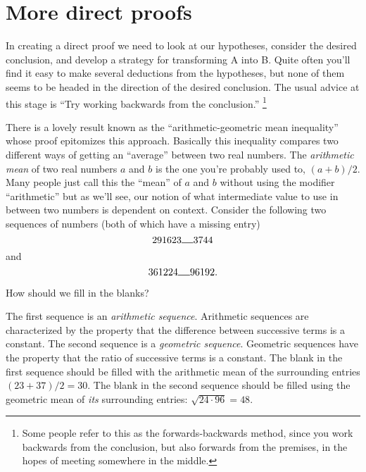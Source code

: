 \documentclass[10pt,]{book}
\theoremstyle{plain}
\theoremstyle{definition}
\theoremstyle{definition}
\numberwithin{equation}{section}
\begin{document}
\section[{More direct proofs}]{More direct proofs}\label{sec_more}

    In creating a direct proof we need to look at our hypotheses, consider
    the desired conclusion, and develop a strategy for transforming A into B.
    Quite often you'll find it easy to make several deductions from the
    hypotheses, but none of them seems to be headed in the direction of
    the desired conclusion. The usual advice at this stage is
    ``Try working backwards from the conclusion.''
    \footnote{Some people refer to this as the forwards-backwards method, since 
    you work backwards from the conclusion, but also forwards from the premises, 
    in the hopes of meeting somewhere in the middle.\label{fn-20}}
\par

    There is a lovely result known as the
    ``arithmetic-geometric mean inequality''
    whose proof epitomizes this approach. Basically this inequality compares two
    different ways of getting an ``average'' between two real numbers. The
    \emph{arithmetic mean} of two real numbers \(a\) and \(b\) is the one you're
    probably used to, \((a+b)/2\). Many people just call this the ``mean''
    of \(a\) and \(b\) without using the modifier ``arithmetic'' but as we'll
    see, our notion of what intermediate value to use in between two numbers
    is dependent on context. Consider the following two sequences of numbers
    (both of which have a missing entry)
    \begin{equation*}
      2  9   16   23   \rule{12pt}{.5pt}   37   44
    \end{equation*}
    and
    \begin{equation*}
      3  6   12   24   \rule{12pt}{.5pt}   96   192.
    \end{equation*}
\par

    How should we fill in the blanks?
\par

    The first sequence is an
    \emph{arithmetic sequence}.
    Arithmetic sequences
    are characterized by the property that the difference between successive
    terms is a constant. The second sequence is a
    \emph{geometric sequence}.
    Geometric sequences have the property that the ratio of successive terms
    is a constant. The blank in the first sequence should be filled with the
    arithmetic mean of the surrounding entries \((23+37)/2 = 30\). The blank
    in the second sequence should be filled using the
    geometric mean
    of \emph{its} surrounding entries: \(\sqrt{24\cdot 96} = 48\).
\par
\end{document}
